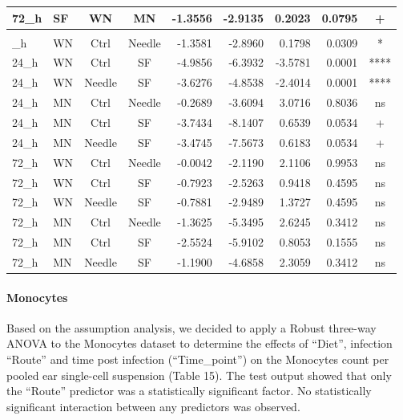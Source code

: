 \documentclass[
  12pt,
  letterpaper,
]{article}
\begin{document}
\begin{longtable}{llccrrrrc}
72\_h & SF & WN & MN & -1.3556 & -2.9135 & 0.2023 & 0.0795 & + \\ 
\midrule\addlinespace[2.5pt]
\multicolumn{9}{l}{Predictor: Route} \\ 
\midrule\addlinespace[2.5pt]
24\_h & WN & Ctrl & Needle & -1.3581 & -2.8960 & 0.1798 & 0.0309 & * \\ 
24\_h & WN & Ctrl & SF & -4.9856 & -6.3932 & -3.5781 & 0.0001 & **** \\ 
24\_h & WN & Needle & SF & -3.6276 & -4.8538 & -2.4014 & 0.0001 & **** \\ 
24\_h & MN & Ctrl & Needle & -0.2689 & -3.6094 & 3.0716 & 0.8036 & ns \\ 
24\_h & MN & Ctrl & SF & -3.7434 & -8.1407 & 0.6539 & 0.0534 & + \\ 
24\_h & MN & Needle & SF & -3.4745 & -7.5673 & 0.6183 & 0.0534 & + \\ 
72\_h & WN & Ctrl & Needle & -0.0042 & -2.1190 & 2.1106 & 0.9953 & ns \\ 
72\_h & WN & Ctrl & SF & -0.7923 & -2.5263 & 0.9418 & 0.4595 & ns \\ 
72\_h & WN & Needle & SF & -0.7881 & -2.9489 & 1.3727 & 0.4595 & ns \\ 
72\_h & MN & Ctrl & Needle & -1.3625 & -5.3495 & 2.6245 & 0.3412 & ns \\ 
72\_h & MN & Ctrl & SF & -2.5524 & -5.9102 & 0.8053 & 0.1555 & ns \\ 
72\_h & MN & Needle & SF & -1.1900 & -4.6858 & 2.3059 & 0.3412 & ns \\ 
\bottomrule
\end{longtable}

\paragraph{Monocytes}\label{monocytes-1}

Based on the assumption analysis, we decided to apply a Robust three-way ANOVA to the Monocytes dataset to determine the effects of ``Diet'', infection ``Route'' and time post infection (``Time\_point'') on the Monocytes count per pooled ear single-cell suspension (Table 15). The test output showed that only the ``Route'' predictor was a statistically significant factor. No statistically significant interaction between any predictors was observed.
\end{document}
